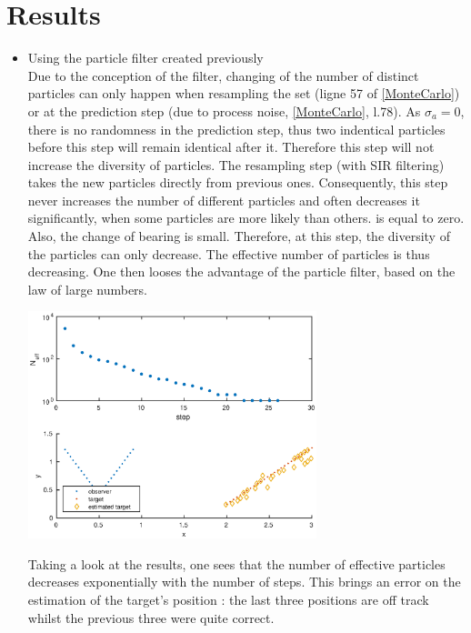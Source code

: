 \documentclass[english,DIV=13]{scrreprt}
\begin{document}
\section*{Results}
\begin{itemize}
\item Using the particle filter created previously\\
Due to the conception of the filter, changing of the number of distinct particles can only happen when resampling the set (ligne 57 of
\ref{MonteCarlo}) or at the prediction step (due to process noise, \ref{MonteCarlo}, l.78).
As $\sigma_a = 0$, there is no randomness in the prediction step, thus two indentical particles before this step will remain identical
after it. Therefore this step will not increase the diversity of particles.
The resampling step (with SIR filtering) takes the new particles directly from previous ones. Consequently, this step never
increases the number of different particles and often decreases it significantly, when some particles are more likely than others.
is equal to zero. Also, the change of bearing is small. Therefore, at this step,  the diversity of the particles can only decrease.
The effective number of particles is thus decreasing. One then looses the advantage of the particle filter, based on
the law of large numbers.\\
\begin{center}
 \includegraphics[width=0.66\textwidth]{img/q51.eps}
\end{center}
Taking a look at the results, one sees that the number of effective particles decreases exponentially with the number of steps.
This brings an error on the estimation of the target's position : the last three positions are off track whilst the previous three
were quite correct.


\end{itemize}
\end{document}
